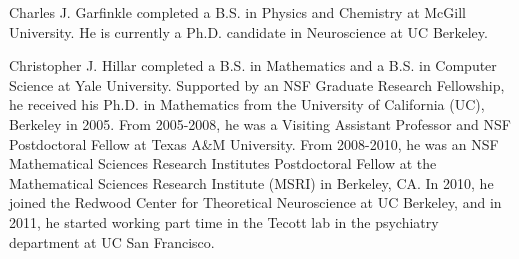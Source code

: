 \documentclass[journal, twocolumn]{IEEEtran}
\begin{document}



\begin{IEEEbiographynophoto}{Charles J. Garfinkle}
completed a B.S. in Physics and Chemistry at McGill University. He is currently a Ph.D. candidate in Neuroscience at UC Berkeley.
\end{IEEEbiographynophoto}

\begin{IEEEbiographynophoto}{Christopher J. Hillar}
completed a B.S. in Mathematics and a B.S. in Computer Science at Yale University.  Supported by an NSF Graduate Research Fellowship, he received his Ph.D. in Mathematics from the University of California (UC), Berkeley in 2005. From 2005-2008, he was a Visiting Assistant Professor and NSF Postdoctoral Fellow at Texas A\&M University. From 2008-2010, he was an NSF Mathematical Sciences Research Institutes Postdoctoral Fellow at the Mathematical Sciences Research Institute (MSRI) in Berkeley, CA.  In 2010, he joined the Redwood Center for Theoretical Neuroscience at UC Berkeley, and in 2011, he started working part time in the Tecott lab in the psychiatry department at UC San Francisco.
\end{IEEEbiographynophoto}
\end{document}
